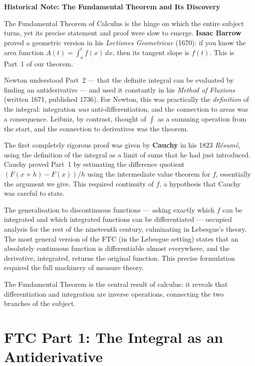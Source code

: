 \documentclass[12pt, openany]{book}
\theoremstyle{plain}
\theoremstyle{definition}
\theoremstyle{remark}
\begin{document}
\begin{remarkbox}
\textbf{Historical Note: The Fundamental Theorem and Its Discovery}

The Fundamental Theorem of Calculus is the hinge on which the entire subject turns, yet its precise statement and proof were slow to emerge. \textbf{Isaac Barrow} proved a geometric version in his \emph{Lectiones Geometricae} (1670): if you know the area function $A(t) = \int_a^t f(x)\,dx$, then its tangent slope is $f(t)$. This is Part~1 of our theorem.

Newton understood Part~2 --- that the definite integral can be evaluated by finding an antiderivative --- and used it constantly in his \emph{Method of Fluxions} (written 1671, published 1736). For Newton, this was practically the \emph{definition} of the integral: integration \emph{was} anti-differentiation, and the connection to areas was a consequence. Leibniz, by contrast, thought of $\int$ as a summing operation from the start, and the connection to derivatives was the theorem.

The first completely rigorous proof was given by \textbf{Cauchy} in his 1823 \emph{R\'{e}sum\'{e}}, using the definition of the integral as a limit of sums that he had just introduced. Cauchy proved Part~1 by estimating the difference quotient $(F(x+h) - F(x))/h$ using the intermediate value theorem for $f$, essentially the argument we give. This required continuity of $f$, a hypothesis that Cauchy was careful to state.

The generalisation to discontinuous functions --- asking exactly which $f$ can be integrated and which integrated functions can be differentiated --- occupied analysis for the rest of the nineteenth century, culminating in Lebesgue's theory. The most general version of the FTC (in the Lebesgue setting) states that an absolutely continuous function is differentiable almost everywhere, and the derivative, integrated, returns the original function. This precise formulation required the full machinery of measure theory.
\end{remarkbox}
\color{black}

The Fundamental Theorem is the central result of calculus: it reveals that differentiation and integration are inverse operations, connecting the two branches of the subject.

\section{FTC Part 1: The Integral as an Antiderivative}
\end{document}
